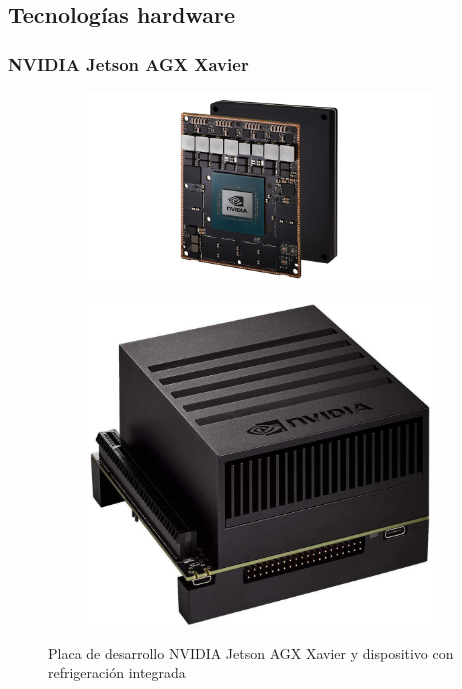 \subsection{Tecnologías hardware}
\subsubsection{NVIDIA Jetson AGX Xavier}

\begin{figure}[h!]
    \begin{subfigure}[c]{.5\textwidth}
        \centering
        \includegraphics[width=\linewidth]{img/JetsonXavier2.png}
    \end{subfigure}%
    \begin{subfigure}[c]{.5\textwidth}
      \centering
      \includegraphics[width=.8\linewidth]{img/jetsonAGX.jpg}
    \end{subfigure}

    \caption{Placa de desarrollo NVIDIA Jetson AGX Xavier y dispositivo con refrigeración integrada}
    \label{fig:jetson}
\end{figure}

